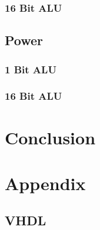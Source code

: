 \documentclass[11pt]{article}
\begin{document}
		
		\subsubsection{16 Bit ALU}
	
	\subsection{Power}
		
		\subsubsection{1 Bit ALU}
		
		\subsubsection{16 Bit ALU}

\section{Conclusion}


\section{Appendix}

	\subsection{VHDL}
	
\end{document}
